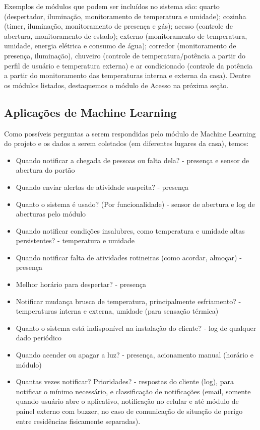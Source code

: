 Exemplos de módulos que podem ser incluídos no sistema são: quarto (despertador, iluminação, monitoramento de temperatura e umidade); cozinha (timer, iluminação, monitoramento de presença e gás); acesso (controle de abertura, monitoramento de estado); externo (monitoramento de temperatura, umidade, energia elétrica e consumo de água); corredor (monitoramento de presença, iluminação), chuveiro (controle de temperatura/potência a partir do perfil de usuário e temperatura externa) e ar condicionado (controle da potência a partir do monitoramento das temperaturas interna e externa da casa). Dentre os módulos listados, destaquemos o módulo de Acesso na próxima seção.

\subsection{Aplicações de Machine Learning}
Como possíveis perguntas a serem respondidas pelo módulo de Machine Learning do projeto e os dados a serem coletados (em diferentes lugares da casa), temos:

\begin{itemize}
\item Quando notificar a chegada de pessoas ou falta dela? - presença e sensor de abertura do portão
\item Quando enviar alertas de atividade suspeita? - presença
\item Quanto o sistema é usado? (Por funcionalidade) - sensor de abertura e log de aberturas pelo módulo
\item Quando notificar condições insalubres, como temperatura e umidade altas persistentes? - temperatura e umidade
\item Quando notificar falta de atividades rotineiras (como acordar, almoçar) - presença
\item Melhor horário para despertar? - presença
\item Notificar mudança brusca de temperatura, principalmente esfriamento? - temperaturas interna e externa, umidade (para sensação térmica)
\item Quanto o sistema está indisponível na instalação do cliente? - log de qualquer dado periódico
\item Quando acender ou apagar a luz? - presença, acionamento manual (horário e módulo)
\item Quantas vezes notificar? Prioridades? - respostas do cliente (log), para notificar o mínimo necessário, e classificação de notificações (email, somente quando usuário abre o aplicativo, notificação no celular e até módulo de painel externo com buzzer, no caso de comunicação de situação de perigo entre residências fisicamente separadas).
\end{itemize}


